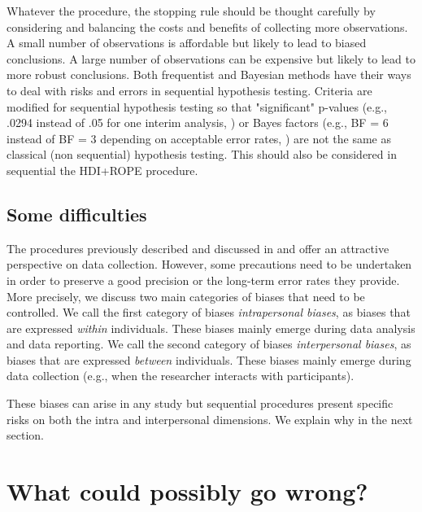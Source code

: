 \documentclass[a4paper,jou,natbib,floatsintext,donotrepeattitle]{apa6}
\begin{document}
Whatever the procedure, the stopping rule should be thought carefully by considering and balancing the costs and benefits of collecting more observations. A small number of observations is affordable but likely to lead to biased conclusions. A large number of observations can be expensive but likely to lead to more robust conclusions. Both frequentist and Bayesian methods have their ways to deal with risks and errors in sequential hypothesis testing. Criteria are modified for sequential hypothesis testing so that "significant" p-values (e.g., .0294 instead of .05 for one interim analysis, \citealt{lakens_performing_2014}) or Bayes factors (e.g., BF = 6 instead of BF = 3 depending on acceptable error rates, \citealt{schonbrodt_sequential_2017}) are not the same as classical (non sequential) hypothesis testing. This should also be considered in sequential the HDI+ROPE procedure.


\subsection{Some difficulties}

The procedures previously described and discussed in \cite{schonbrodt_sequential_2017} and \cite{kruschke_doing_2015,kruschke_rejecting_2018} offer an attractive perspective on data collection. However, some precautions need to be undertaken in order to preserve a good precision or the long-term error rates they provide. More precisely, we discuss two main categories of biases that need to be controlled. We call the first category of biases \textit{intrapersonal biases}, as biases that are expressed \textit{within} individuals. These biases mainly emerge during data analysis and data reporting. We call the second category of biases \textit{interpersonal biases}, as biases that are expressed \textit{between} individuals. These biases mainly emerge during data collection (e.g., when the researcher interacts with participants). \par

These biases can arise in any study but sequential procedures present specific risks on both the intra and interpersonal dimensions. We explain why in the next section.

\section{What could possibly go wrong?}
\end{document}
